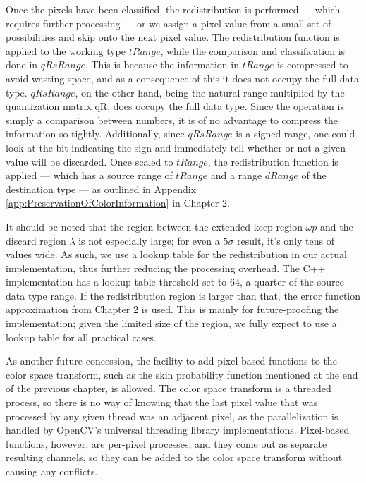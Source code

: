 Once the pixels have been classified, the redistribution is performed --- which requires further processing --- or we assign a pixel value from a small set of possibilities and skip onto the next pixel value. The redistribution function is applied to the working type $tRange$, while the comparison and classification is done in $qRsRange$. This is because the information in $tRange$ is compressed to avoid wasting space, and as a consequence of this it does not occupy the full data type. $qRsRange$, on the other hand, being the natural range multiplied by the quantization matrix qR, does occupy the full data type. Since the operation is simply a comparison between numbers, it is of no advantage to compress the information so tightly. Additionally, since $qRsRange$ is a signed range, one could look at the bit indicating the sign and immediately tell whether or not a given value will be discarded. Once scaled to $tRange$, the redistribution function is applied --- which has a source range of $tRange$ and a range $dRange$ of the destination type --- as outlined in Appendix \ref{app:PreservationOfColorInformation} in Chapter 2.

It should be noted that the region between the extended keep region $\omega p$ and the discard region $\lambda$ is not especially large; for even a $5\sigma$ result, it's only tens of values wide. As such, we use a lookup table for the redistribution in our actual implementation, thus further reducing the processing overhead. The C++ implementation has a lookup table threshold set to 64, a quarter of the source data type range. If the redistribution region is larger than that, the error function approximation from Chapter 2 is used. This is mainly for future-proofing the implementation; given the limited size of the region, we fully expect to use a lookup table for all practical cases.

As another future concession, the facility to add pixel-based functions to the color space transform, such as the skin probability function mentioned at the end of the previous chapter, is allowed. The color space transform is a threaded process, so there is no way of knowing that the last pixel value that was processed by any given thread was an adjacent pixel, as the parallelization is handled by OpenCV's universal threading library implementations. Pixel-based functions, however, are per-pixel processes, and they come out as separate resulting channels, so they can be added to the color space transform without causing any conflicts.



